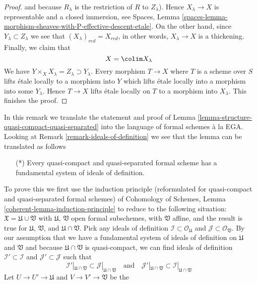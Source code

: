 \begin{proof}
and because $R_\lambda$ is the restriction of $R$ to $Z_\lambda$).
Hence $X_\lambda \to X$ is representable and a closed immersion, see
Spaces, Lemma
\ref{spaces-lemma-morphism-sheaves-with-P-effective-descent-etale}.
On the other hand, since $Y_\lambda \subset Z_\lambda$ we see that
$(X_\lambda)_{red} = X_{red}$, in other words, $X_\lambda \to X$
is a thickening. Finally, we claim that
$$
X = \colim X_\lambda
$$
We have $Y \times_X X_\lambda = Z_\lambda \supset Y_\lambda$. Every
morphism $T \to X$ where $T$ is a scheme over $S$ lifts \'etale locally
to a morphism into $Y$ which lifts \'etale locally into a morphism
into some $Y_\lambda$. Hence $T \to X$ lifts \'etale locally on
$T$ to a morphism into $X_\lambda$. This finishes the proof.
\end{proof}

\begin{remark}
\label{remark-structure-quasi-compact-quasi-separated}
In this remark we translate the statement and proof of
Lemma \ref{lemma-structure-quasi-compact-quasi-separated}
into the language of formal schemes \`a la EGA.
Looking at Remark \ref{remark-ideals-of-definition} we see
that the lemma can be translated as follows
\begin{itemize}
\item[(*)] Every quasi-compact and quasi-separated formal
scheme has a fundamental system of ideals of definition.
\end{itemize}
To prove this we first use the induction principle (reformulated for
quasi-compact and quasi-separated formal schemes) of
Cohomology of Schemes, Lemma \ref{coherent-lemma-induction-principle}
to reduce to the following situation:
$\mathfrak X = \mathfrak U \cup \mathfrak V$
with $\mathfrak U$, $\mathfrak V$ open formal subschemes,
with $\mathfrak V$ affine, and the result is true for $\mathfrak U$,
$\mathfrak V$, and $\mathfrak U \cap \mathfrak V$. Pick any ideals
of definition $\mathcal{I} \subset \mathcal{O}_\mathfrak U$
and $\mathcal{J} \subset \mathcal{O}_\mathfrak V$.
By our assumption that we have a fundamental system of ideals
of definition on $\mathfrak U$ and $\mathfrak V$ and because
$\mathfrak U \cap \mathfrak V$ is quasi-compact, we can find
ideals of definition $\mathcal{I}' \subset \mathcal{I}$
and $\mathcal{J}' \subset \mathcal{J}$
such that
$$
\mathcal{I}'|_{\mathfrak U \cap \mathfrak V} \subset
\mathcal{J}|_{\mathfrak U \cap \mathfrak V}
\quad\text{and}\quad
\mathcal{J}'|_{\mathfrak U \cap \mathfrak V} \subset
\mathcal{I}|_{\mathfrak U \cap \mathfrak V}
$$
Let $U \to U' \to \mathfrak U$ and $V \to V' \to \mathfrak V$ be the

\end{remark}
